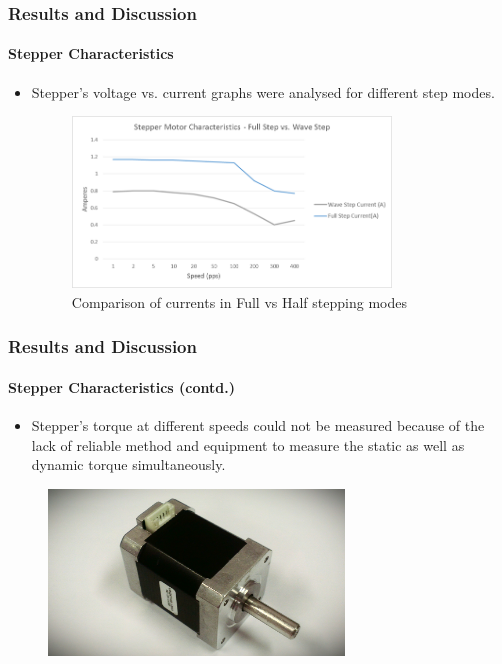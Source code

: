 \documentclass[table,10pt,red]{beamer}	%
\begin{document}
\begin{frame}
	\frametitle{Results and Discussion}
	\framesubtitle{Stepper Characteristics}
	\begin{itemize}
		\item Stepper's voltage vs. current graphs were analysed for different step modes.
		\begin{figure}
			\includegraphics[width=0.8\textwidth]{comparison}
			\caption{Comparison of currents in Full vs Half stepping modes}
		\end{figure}
	\end{itemize}
\end{frame}

\begin{frame}
	\frametitle{Results and Discussion}
	\framesubtitle{Stepper Characteristics (contd.)}
	\begin{itemize}
		\item Stepper's torque at different speeds could not be measured because of the lack of reliable method and equipment to measure the static as well as dynamic torque simultaneously.
	\end{itemize}
	\begin{figure}
		\includegraphics[width=0.7\textwidth]{IMAG0758_1}
	\end{figure}
\end{frame}
\end{document}
